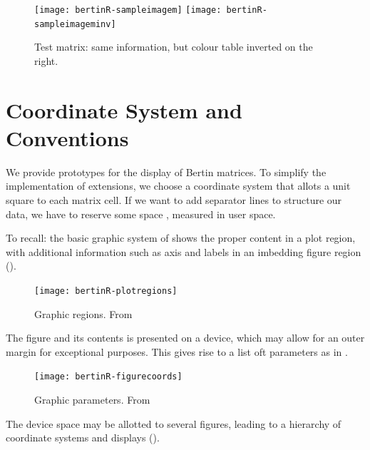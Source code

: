 \documentclass[nogin, dvips,12pt,a4paper,twoside]{amsart}
\begin{document}

\begin{figure}[htbp]
\begin{center}
\texttt{[image: bertinR-sampleimagem]}
\texttt{[image: bertinR-sampleimageminv]}
\caption{Test matrix: same information, but colour table inverted on the right.}\label{fig:sampleimagem}\label{fig:sampleimageminv}
\end{center}
\end{figure}
%
{}

\clearpage

\section{Coordinate System and Conventions}
\label{sec:coords}

We provide prototypes for the display of Bertin matrices. To simplify the implementation of extensions, we choose a coordinate system that allots a unit square to each matrix cell. If we want to add separator lines to structure our data, we have to reserve some space , measured in user space. 

To recall: the basic graphic system of  \R{} shows the proper content in a plot region, with additional information such as axis and labels in an imbedding figure region  ().
%

\begin{figure}[htbp]
\begin{center}
\texttt{[image: bertinR-plotregions]}
\caption{Graphic regions.  From \cite{Murrell2011R-Graphics}}
\label{fig:plotregions}
\end{center}
\end{figure}
%
The figure and its contents is presented on a device, which may allow for an outer margin for exceptional purposes. This gives rise to a list oft parameters as in .
%
\begin{figure}[htbp]
\begin{center}
\texttt{[image: bertinR-figurecoords]}
\caption{Graphic parameters.  From \cite{Murrell2011R-Graphics}}
\label{fig:figurecoords}
\end{center}
\end{figure}
%
The device space may be allotted to several figures, leading to a hierarchy of coordinate systems and displays ().
\end{document}
